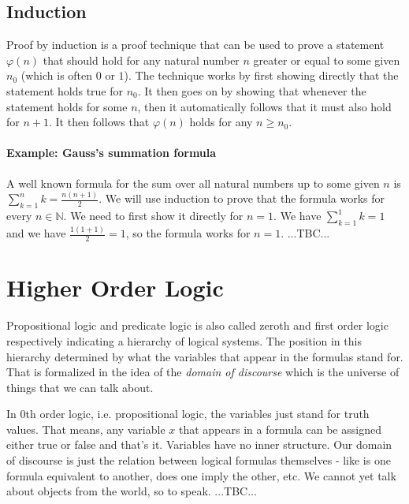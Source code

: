 
\subsection{Induction}
Proof by induction is a proof technique that can be used to prove a statement $\varphi(n)$ that should hold for any natural number $n$ greater or equal to some given $n_0$ (which is often $0$ or $1$). The technique works by first showing directly that the statement holds true for $n_0$. It then goes on by showing that whenever the statement holds for some $n$, then it automatically follows that it must also hold for $n+1$. It then follows that $\varphi(n)$ holds for any $n \geq n_0$.

\paragraph{Example: Gauss's summation formula} A well known formula for the sum over all natural numbers up to some given $n$ is $\sum_{k=1}^n k = \frac{n (n+1)}{2}$. We will use induction to prove that the formula works for every $n \in \mathbb{N}$. We need to first show it directly for $n=1$. We have $\sum_{k=1}^1 k = 1$ and we have $\frac{1 (1+1)}{2} = 1$, so the formula works for $n=1$. ...TBC...





\section{Higher Order Logic}
Propositional logic and predicate logic is also called zeroth and first order logic respectively indicating a hierarchy of logical systems. The position in this hierarchy determined by what the variables that appear in the formulas stand for. That is formalized in the idea of the \emph{domain of discourse} which is the universe of things that we can talk about.

\medskip
In 0th order logic, i.e. propositional logic, the variables just stand for truth values. That means, any variable $x$ that appears in a formula can be assigned either true or false and that's it. Variables have no inner structure. Our domain of discourse is just the relation between logical formulas themselves - like is one formula equivalent to another, does one imply the other, etc. We cannot yet talk about objects from the world, so to speak. ...TBC...

